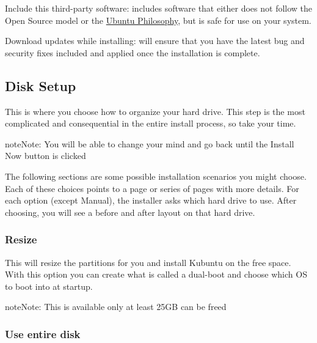 \documentclass[letterpaper,10pt,english]{sphinxmanual}
\begin{document}

Include this third-party software: includes software that either does not follow the Open Source model or the \href{http://www.ubuntu.com/about/about-ubuntu/our-philosophy}{Ubuntu Philosophy}, but is safe for use on your system.

Download updates while installing: will ensure that you have the latest bug and security fixes included and applied once the installation is complete.


\subsection{Disk Setup}
\label{\detokenize{docs/installation:disk-setup}}
This is where you choose how to organize your hard drive. This step is the most complicated and consequential in the entire install process, so take your time.

\begin{sphinxadmonition}{note}{Note:}
You will be able to change your mind and go back until the Install Now button is clicked
\end{sphinxadmonition}

The following sections are some possible installation scenarios you might choose. Each of these choices points to a page or series of pages with more details. For each option (except Manual), the installer asks which hard drive to use. After choosing, you will see a before and after layout on that hard drive.


\subsubsection{Resize}
\label{\detokenize{docs/installation:resize}}
This will resize the partitions for you and install Kubuntu on the free space. With this option you can create what is called a dual-boot and choose which OS to boot into at startup.

\begin{sphinxadmonition}{note}{Note:}
This is available only at least 25GB can be freed
\end{sphinxadmonition}


\subsubsection{Use entire disk}
\label{\detokenize{docs/installation:use-entire-disk}}
\end{document}

